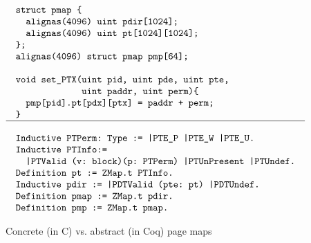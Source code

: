 \begin{figure}[t]\scriptsize
$$
\begin{array}{l}
\begin{array}{l}
\verb+struct pmap {+\\
\verb+  alignas(4096) uint pdir[1024];+\\
\verb+  alignas(4096) uint pt[1024][1024];+\\
\verb+};+\\
\verb+alignas(4096) struct pmap pmp[64];+\\
\\
\verb+void set_PTX(uint pid, uint pde, uint pte,+\\
\verb+             uint paddr, uint perm){+\\
\verb"  pmp[pid].pt[pdx][ptx] = paddr + perm;"\\
\verb+}+
\end{array}
\\
\hline
\\
\begin{array}{l}
\verb+Inductive PTPerm: Type := |PTE_P |PTE_W |PTE_U.+\\
\verb+Inductive PTInfo:=+\\
\verb+  |PTValid (v: block)(p: PTPerm) |PTUnPresent |PTUndef.+\\
\verb+Definition pt := ZMap.t PTInfo.+\\
\verb+Inductive pdir := |PDTValid (pte: pt) |PDTUndef.+\\
\verb+Definition pmap := ZMap.t pdir.+\\
\verb+Definition pmp := ZMap.t pmap.+
\end{array}
\end{array}
$$ 
\caption{Concrete (in C) vs. abstract (in Coq) page maps}
\label{fig:pmap}
\end{figure}

